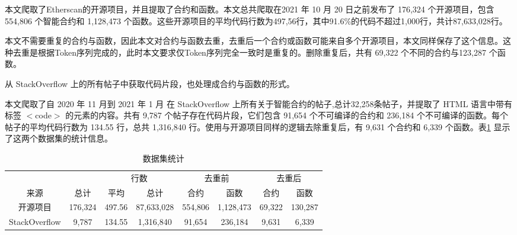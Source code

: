 本文爬取了Etherscan的开源项目，并且提取了合约和函数。本文总共爬取在2021 年 10 月 20 日之前发布了 176,324 个开源项目，包含 554,806 个智能合约和 1,128,473 个函数。这些开源项目的平均代码行数为497,56行，其中91.6\%的代码不超过1,000行，共计87,633,028行。

本文不需要重复的合约与函数，因此本文对合约与函数去重，去重后一个合约或函数可能来自多个开源项目，本文同样保存了这个信息。这种去重是根据Token序列完成的，此时本文要求仅Token序列完全一致时是重复的。删除重复后，共有 69,322 个不同的合约与123,287 个函数。


从 StackOverflow 上的所有帖子中获取代码片段，也处理成合约与函数的形式。

本文爬取了自 2020 年 11 月到 2021 年 1 月 在 StackOverflow 上所有关于智能合约的帖子,总计32,258条帖子，并提取了 HTML 语言中带有标签 $<$code$>$ 的元素的内容。共有 9,787 个帖子存在代码片段，它们包含 91,654 个不可编译的合约和 236,184 个不可编译的函数。每个帖子的平均代码行数为 134.55 行，总共 1,316,840 行。使用与开源项目同样的逻辑去除重复后，有 9,631 个合约和 6,339 个函数。表\ref{dataset} 显示了这两个数据集的统计信息。

\begin{table}[]%
\centering

\begin{tabular}{c c c c c c c c}
\hline
                         & {\color[HTML]{494949} }                        & \multicolumn{2}{c}{行数} & \multicolumn{2}{c}{{\color[HTML]{494949} 去重前}} & \multicolumn{2}{c}{去重后} \\ \cmidrule(r){3-4}  \cmidrule(r){5-6} \cmidrule{7-8} 
\multirow{-2}{*}{来源} & \multirow{-2}{*}{{\color[HTML]{494949} 总计}} & 平均    & 总计         & 合约                      & 函数                      & 合约          & 函数          \\ \hline
开源项目           & 176,324                                        & 497.56     & 87,633,028    & 554,806                        & 1,128,473                      & 69,322             & 130,287            \\ %
StackOverflow          & 9,787                                          & 134.55     & 1,316,840     & 91,654                         & 236,184                        & 9,631              & 6,339              \\ \hline
\end{tabular}
\caption{数据集统计}
\label{dataset}
\end{table}

